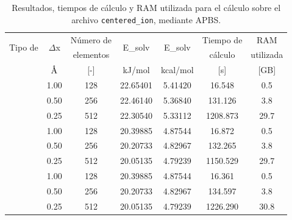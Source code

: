 \documentclass[12pt, twoside, onehalfspace, numbers, spanish]{ezthesis}
\numberwithin{equation}{section}
\newcommand{\angstrom}{\text{\normalfont\AA}}
\begin{document}
\begin{table}[h]
	\centering
	\caption{Resultados, tiempos de cálculo y RAM utilizada para el cálculo sobre el archivo \texttt{centered\_ion}, mediante APBS.}
	\def\arraystretch{1.2}
	\begin{tabular}{|c|cccccc|}\hline
		\multirow{2}{*}{Tipo de} & \multirow{2}{*}{$\Delta$x} & Número de & \multirow{2}{*}{E\_solv} & \multirow{2}{*}{E\_solv} & Tiempo de & RAM\\
		\multirow{2}{*}{condición} &  & elementos &  &  & cálculo & utilizada\\ \cline{2-7}
		&  $\angstrom$ & [-] & kJ/mol & kcal/mol & [s] & [GB] \\\hline
		\parbox[t]{2mm}{} & 1.00 & 128 & 22.65401 & 5.41420 & 16.548 & 0.5\\
		& 0.50 & 256 & 22.46140 & 5.36840 & 131.126 & 3.8\\
		& 0.25 & 512 & 22.30540 & 5.33112 & 1208.873 & 29.7\\ \hline
		\parbox[t]{2mm}{} & 1.00 & 128 & 20.39885 & 4.87544 & 16.872 & 0.5\\
		& 0.50 & 256 & 20.20733 & 4.82967 & 132.265 & 3.8\\
		& 0.25 & 512 & 20.05135 & 4.79239 & 1150.529 & 29.7\\ \hline
		\parbox[t]{2mm}{} & 1.00 & 128 & 20.39885 & 4.87544 & 16.361 & 0.5\\
		& 0.50 & 256 & 20.20733 & 4.82967 & 134.597 & 3.8\\
		& 0.25 & 512 & 20.05135 & 4.79239 & 1226.290 & 30.8\\ \hline
	\end{tabular}\label{table:apbs_centered_ion}
\end{table}
\end{document}
